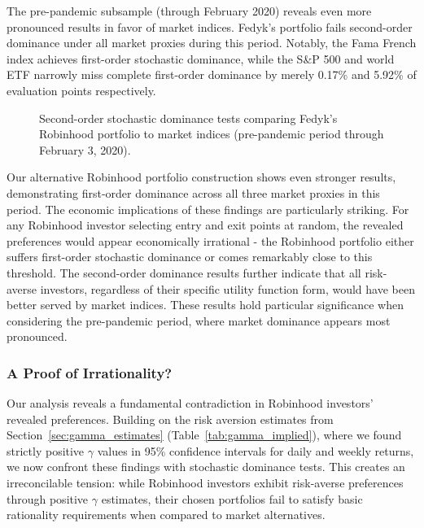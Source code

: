 The pre-pandemic subsample (through February 2020) reveals even more pronounced results in favor of market indices. 
Fedyk's portfolio fails second-order dominance under all market proxies during this period. 
Notably, the Fama French index achieves first-order stochastic dominance, while the S\&P 500 and world ETF narrowly miss complete first-order dominance by merely 0.17\% and 5.92\% of evaluation points respectively. 

\begin{figure}[H]
    \centering
    \hfill
    \caption{Second-order stochastic dominance tests comparing Fedyk's Robinhood portfolio to market indices (pre-pandemic period through February 3, 2020).}
    \label{fig:cutoff_all_sidebyside}
\end{figure}

Our alternative Robinhood portfolio construction shows even stronger results, demonstrating first-order dominance across all three market proxies in this period.
The economic implications of these findings are particularly striking. 
For any Robinhood investor selecting entry and exit points at random, the revealed preferences would appear economically irrational - the Robinhood portfolio either suffers first-order stochastic dominance or comes remarkably close to this threshold. 
The second-order dominance results further indicate that all risk-averse investors, regardless of their specific utility function form, would have been better served by market indices. 
These results hold particular significance when considering the pre-pandemic period, where market dominance appears most pronounced.

\subsubsection{A Proof of Irrationality?}
Our analysis reveals a fundamental contradiction in Robinhood investors' revealed preferences. 
Building on the risk aversion estimates from Section~\ref{sec:gamma_estimates} (Table~\ref{tab:gamma_implied}), where we found strictly positive $\gamma$ values in 95\% confidence intervals for daily and weekly returns, we now confront these findings with stochastic dominance tests. 
This creates an irreconcilable tension: while Robinhood investors exhibit risk-averse preferences through positive $\gamma$ estimates, their chosen portfolios fail to satisfy basic rationality requirements when compared to market alternatives.


